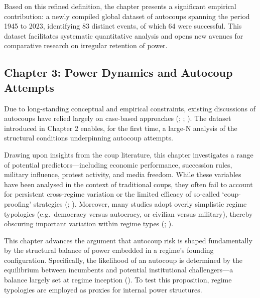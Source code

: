 \documentclass[
  12pt,
]{report}
\begin{document}
Based on this refined definition, the chapter presents a significant
empirical contribution: a newly compiled global dataset of autocoups
spanning the period 1945 to 2023, identifying 83 distinct events, of
which 64 were successful. This dataset facilitates systematic
quantitative analysis and opens new avenues for comparative research on
irregular retention of power.

\subsection*{Chapter 3: Power Dynamics and Autocoup
Attempts}\label{chapter-3-power-dynamics-and-autocoup-attempts}

Due to long-standing conceptual and empirical constraints, existing
discussions of autocoups have relied largely on case-based approaches
(;
;
). The dataset
introduced in Chapter 2 enables, for the first time, a large-N analysis
of the structural conditions underpinning autocoup attempts.

Drawing upon insights from the coup literature, this chapter
investigates a range of potential predictors---including economic
performance, succession rules, military influence, protest activity, and
media freedom. While these variables have been analysed in the context
of traditional coups, they often fail to account for persistent
cross-regime variation or the limited efficacy of so-called
`coup-proofing' strategies (; ). Moreover, many studies
adopt overly simplistic regime typologies (e.g.~democracy versus
autocracy, or civilian versus military), thereby obscuring important
variation within regime types (; ).

This chapter advances the argument that autocoup risk is shaped
fundamentally by the structural balance of power embedded in a regime's
founding configuration. Specifically, the likelihood of an autocoup is
determined by the equilibrium between incumbents and potential
institutional challengers---a balance largely set at regime inception
(). To test
this proposition, regime typologies are employed as proxies for internal
power structures.
\end{document}
